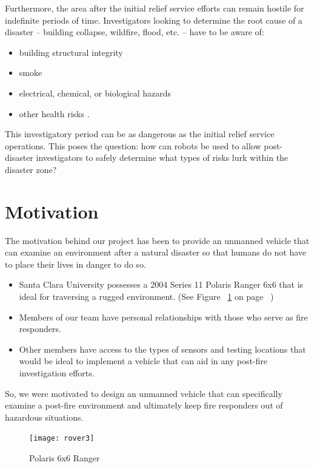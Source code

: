 Furthermore, the area after the initial relief service efforts can remain hostile for indefinite periods of time.  Investigators looking to determine the root cause of a disaster -- building collapse, wildfire, flood, etc. -- have to be aware of:
\begin{itemize}
  \item building structural integrity
  \item smoke
  \item electrical, chemical, or biological hazards
  \item other health risks \cite{firearsonsceneevidence}.
\end{itemize}   This investigatory period can be as dangerous as the initial relief service operations. This poses the question: how can robots be used to allow post-disaster investigators to safely determine what types of risks lurk within the disaster zone?

\section{Motivation}
The motivation behind our project has been to provide an unmanned vehicle that can examine an environment after a natural disaster so that humans do not have to place their lives in danger to do so. 
\begin{itemize}
\item Santa Clara University possesses a 2004 Series 11 Polaris Ranger 6x6 that is ideal for traversing a rugged environment. (See Figure ~\ref{fig:rover3fig} on page ~\pageref{fig:rover3fig})
\item Members of our team have personal relationships with those who serve as fire responders.
\item Other members have access to the types of sensors and testing locations that would be ideal to implement a vehicle that can aid in any post-fire investigation efforts.
\end{itemize} 
So, we were motivated to design an unmanned vehicle that can specifically examine a post-fire environment and ultimately keep fire responders out of hazardous situations.

\begin{figure}[H]
\centering
\texttt{[image: rover3]}
\caption{Polaris 6x6 Ranger}
\label{fig:rover3fig}
\end{figure}

